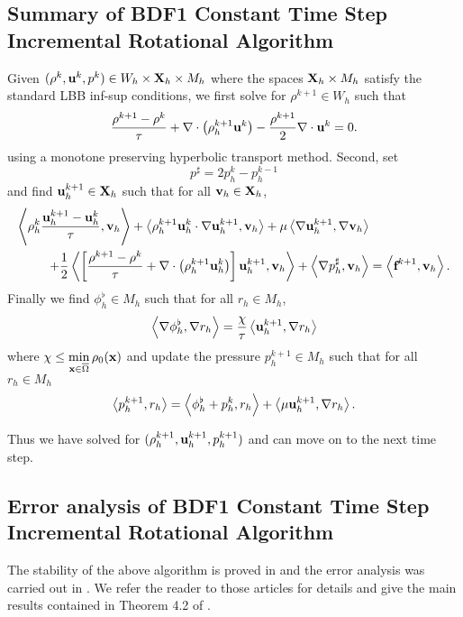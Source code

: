 \documentclass[letterpaper]{erdc}
\begin{document}
\subsection{Summary of BDF1 Constant Time Step Incremental Rotational Algorithm}\label{subsec:BDF1constantTimeSummary}
Given $(\rho^{k}, \textbf{u}^{k}, p^{k})\in W_h\times \textbf{X}_h\times M_h$ where the spaces $\textbf{X}_h\times M_h$ satisfy the standard LBB inf-sup conditions, we first solve for $\rho^{k+1}\in W_h$ such that
\begin{equation}
  \frac{\rho^{k+1} - \rho^k}{\tau} + \nabla\cdot\left(\rho_h^{k+1}\textbf{u}^{k} \right) - \frac{\rho^{k+1}}{2}\nabla\cdot\textbf{u}^{k} = 0.
\end{equation}
using a monotone preserving hyperbolic transport method.  Second, set 
\begin{equation}
  p^{\sharp} = 2p_h^{k} - p_h^{k-1}
\end{equation}
and find $\textbf{u}^{k+1}_h\in\textbf{X}_h$ such that for all $\textbf{v}_h\in\textbf{X}_h$,
\begin{equation}
  \begin{split}
\left\langle  \rho_h^{k}\frac{\textbf{u}_h^{k+1}-\textbf{u}_h^{k} }{\tau} , \textbf{v}_h \right\rangle + \left\langle  \rho_h^{k+1}\textbf{u}_h^{k}\cdot\nabla\textbf{u}_h^{k+1} , \textbf{v}_h \right\rangle + \mu\left\langle  \nabla \textbf{u}_h^{k+1} , \nabla\textbf{v}_h \right\rangle& \\
+ \frac{1}{2}\left\langle \left[\frac{\rho^{k+1}-\rho^{k}}{\tau} + \nabla\cdot\left(\rho_h^{k+1}\textbf{u}_h^{k}\right)\right]\textbf{u}_h^{k+1} , \textbf{v}_h \right\rangle +\left\langle \nabla p_h^{\sharp}, \textbf{v}_h \right\rangle &= \left\langle \textbf{f}^{k+1}, \textbf{v}_h \right\rangle.
\end{split}
\end{equation}
Finally we find $\phi_h^{\flat}\in M_h$ such that for all $r_h\in M_h$,
\begin{equation}
  \left\langle \nabla\phi_h^{\flat}, \nabla r_h \right\rangle = \frac{\chi}{\tau}\left\langle \textbf{u}_h^{k+1}, \nabla r_h \right\rangle
\end{equation}
where $\chi \leq \displaystyle\min_{\textbf{x}\in\overline{\Omega}}\rho_0(\textbf{x})$ and update the pressure $p_h^{k+1}\in M_h$ such that for all $r_h\in M_h$
\begin{equation}
  \left\langle p_h^{k+1}, r_h \right\rangle = \left\langle \phi_h^{\flat} + p_h^{k}, r_h \right\rangle + \left\langle \mu\textbf{u}_h^{k+1}, \nabla r_h \right\rangle.
\end{equation}

Thus we have solved for $(\rho_h^{k+1}, \textbf{u}_h^{k+1}, p_h^{k+1})$ and can move on to the next time step.


\subsection{Error analysis of BDF1 Constant Time Step Incremental Rotational Algorithm}
The stability of the above algorithm is proved in \cite{guermond2009splitting} and the error analysis was carried out in \cite{guermond2011error}.  We refer the reader to those articles for details and give the main results contained in Theorem 4.2 of \cite{guermond2011error}.
\end{document}
